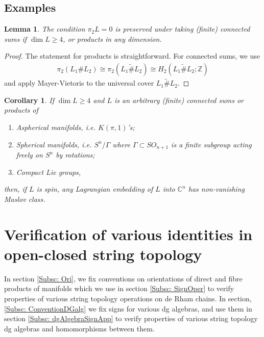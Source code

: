 \documentclass[10pt]{amsart}
\numberwithin{equation}{section}
\theoremstyle{plain}
\newtheorem{lemma}[theorem]{Lemma}
\newtheorem{corollary}[theorem]{Corollary}
\theoremstyle{definition}
\theoremstyle{remark}
\numberwithin{equation}{section}
\newcommand{\Z}{\mathbb{Z}}
\newcommand{\C}{\mathbb{C}}
\newcommand{\wt}[1]{\widetilde{#1}}
\begin{document}
{\subsection{Examples}\label{Subsc: Examples}
\begin{lemma}
	The condition $\pi_2 L=0$ is preserved under taking (finite) connected sums if $\dim L\geq 4$, or products in any dimension.
\end{lemma}
\begin{proof}
	The statement for products is straightforward. For connected sums, we use 
	\begin{align*}
		\pi_2(L_1\# L_2) \cong \pi_2(\wt{L_1 \# L_2}) \cong H_2(\wt{L_1\# L_2};\Z)
	\end{align*}
	and apply Mayer-Vietoris to the universal cover $\wt{L_1\# L_2}$.
\end{proof}



\begin{corollary}
	If $\dim L\geq 4$ and $L$ is an arbitrary (finite) connected sums or products of
	\begin{enumerate}
		\item Aspherical manifolds, i.e. $K(\pi,1)$'s;
		\item Spherical manifolds, i.e. $S^n/\Gamma$ where $\Gamma\subset SO_{n+1}$ is a finite subgroup acting freely on $S^n$ by rotations;
		\item Compact Lie groups,
	\end{enumerate}
	then, if $L$ is spin, any Lagrangian embedding of $L$ into $\C^n$ has non-vanishing Maslov class.
\end{corollary}





\bigskip

\appendix

\section{Verification of various identities in open-closed string topology}
\label{Sec: OCchainSigns}

In section \ref{Subsc: Ori}, we fix conventions on orientations of direct and fibre products of manifolds which we use in section \ref{Subsc: SignOper} to verify properties of various string topology operations on de Rham chains.
In section, \ref{Subsc: ConventionDGalg} we fix signs for various dg algebras, and use them in section \ref{Subsc: dgAlgebraSignApp} to verify properties of various string topology dg algebras and homomorphisms between them.

}
\end{document}

